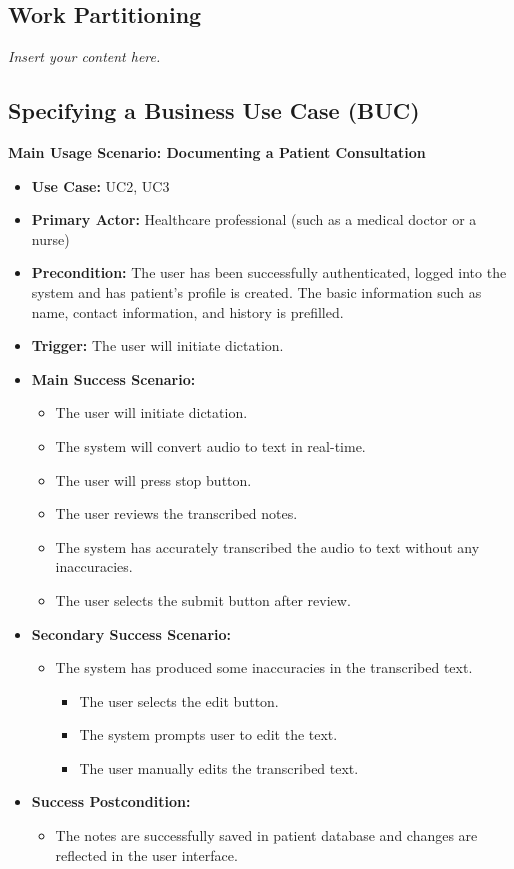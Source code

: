 \documentclass[12pt]{article}
\newcommand{\lips}{\textit{Insert your content here.}}
\begin{document}
\subsection{Work Partitioning}
\lips

\subsection{Specifying a Business Use Case (BUC)}

\textbf{Main Usage Scenario: Documenting a Patient Consultation}

\begin{itemize}
  \item\textbf{Use Case:} UC2, UC3
  \item\textbf{Primary Actor:} Healthcare professional (such as a medical doctor or a nurse)
  \item\textbf{Precondition:} The user has been successfully authenticated, logged into the system and has patient's profile is created. The basic information such as name, contact information, and history is prefilled.
  \item\textbf{Trigger:} The user will initiate dictation.
  \item\textbf{Main Success Scenario:}
  \begin{itemize}
    \item The user will initiate dictation.
    \item The system will convert audio to text in real-time.
    \item The user will press stop button.
    \item The user reviews the transcribed notes. 
    \item The system has accurately transcribed the audio to text without any inaccuracies.
    \item The user selects the submit button after review. 
  \end{itemize}
  \item\textbf{Secondary Success Scenario:}
  \begin{itemize}
    \item The system has produced some inaccuracies in the transcribed text.
    \begin{itemize}
      \item The user selects the edit button.
      \item The system prompts user to edit the text.
      \item The user manually edits the transcribed text.
    \end{itemize} 
  \end{itemize}
  \item\textbf{Success Postcondition:}
  \begin{itemize}
    \item The notes are successfully saved in patient database and changes are reflected in the user interface.
  \end{itemize}
\end{itemize}
\end{document}
